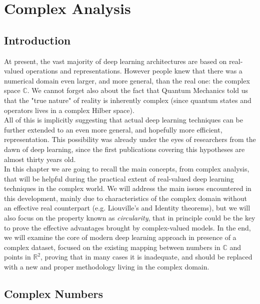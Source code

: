 \documentclass[../main.tex]{subfiles}
\begin{document}
\chapter{Complex Analysis}

\section*{Introduction}

At present, the vast majority of deep learning architectures are based on real-valued operations and representations. However people knew that there was a numerical domain even larger, and more general, than the real one: the complex space $\mathds{C}$. We cannot forget also about the fact that Quantum Mechanics told us that the "true nature" of reality is inherently complex (since quantum states and operators lives in a complex Hilber space).\\ 
All of this is implicitly suggesting that actual deep learning techniques can be further extended to an even more general, and hopefully more efficient, representation. This possibility was already under the eyes of researchers from the dawn of deep learning, since the first publications covering this hypotheses are almost thirty years old.\\
In this chapter we are going to recall the main concepts, from complex analysis, that will be helpful during the practical extent of real-valued deep learning techniques in the complex world. We will address the main issues encountered in this development, mainly due to characteristics of the complex domain without an effective real counterpart (e.g. Liouville's and Identity theorems), but we will also focus on the property known as \textit{circularity}, that in principle could be the key to prove the effective advantages brought by complex-valued models. In the end, we will examine the core of modern deep learning approach in presence of a complex dataset, focused on the existing mapping between numbers in $\mathds{C}$ and points in $\mathds{R}^2$, proving that in many cases it is inadequate, and should be replaced with a new and proper methodology living in the complex domain.

\section{Complex Numbers}
\label{sec:cmplx_numbers}
\end{document}
